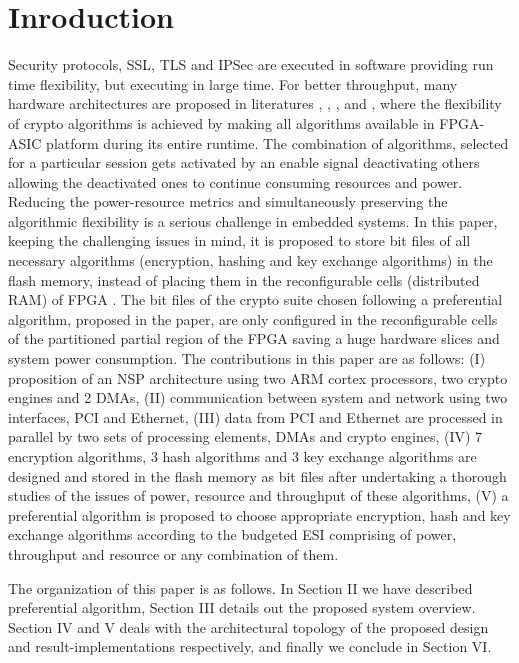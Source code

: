 \documentclass[3p,times]{elsarticle}
\begin{document}
\section{Inroduction}
Security protocols, SSL, TLS and IPSec are executed in software providing run time flexibility, but executing in large time. For better throughput, many hardware architectures are proposed in literatures \cite{ieee:six}, \cite{motorola:ssl}, \cite{broadcom:ssl},  \cite{hifn:ssl} and \cite{ssl:gbps}, where the flexibility of crypto algorithms is achieved by making all algorithms available in FPGA-ASIC platform during its entire runtime. The combination of algorithms, selected for a particular session gets activated by an enable signal deactivating others allowing the deactivated ones to continue consuming resources and power. Reducing the power-resource metrics and simultaneously preserving the algorithmic flexibility is a serious challenge in embedded systems. In this paper, keeping the challenging issues in mind, it is proposed to store bit files of all necessary algorithms (encryption, hashing and key exchange algorithms) in the flash memory, instead of placing them in the reconfigurable cells (distributed RAM) of FPGA \cite{xilinx:fpga}. The bit files of the crypto suite chosen following a preferential algorithm, proposed in the paper, are only configured in the reconfigurable cells of the partitioned partial region of the FPGA saving a huge hardware slices and system power consumption. The contributions in this paper are as follows: (I) proposition of an NSP architecture using two ARM cortex processors, two crypto engines and 2 DMAs, (II) communication between system and network using two interfaces, PCI and Ethernet, (III) data from PCI and Ethernet are processed in parallel by two sets of processing elements, DMAs and crypto engines, (IV) 7 encryption algorithms, 3 hash algorithms and 3 key exchange algorithms are designed and stored in the flash memory as bit files after undertaking a thorough studies of the issues of power, resource and throughput of these algorithms, (V) a preferential algorithm is proposed to choose appropriate encryption, hash and key exchange algorithms according to the budgeted ESI comprising of power, throughput and resource or any combination of them.
\par
The organization of this paper is as follows. In Section II we have described preferential algorithm, Section 
III details out the proposed system overview. Section IV and V deals with the architectural topology of the proposed design and result-implementations respectively, and finally we conclude in Section VI. 
\end{document}
